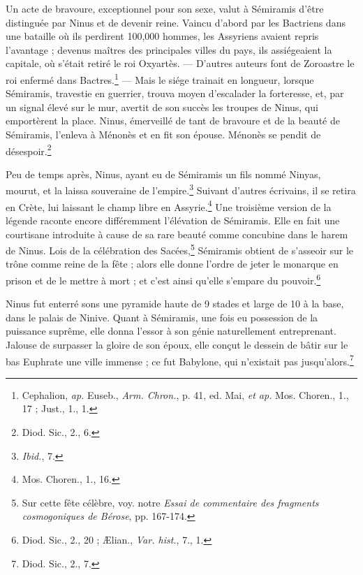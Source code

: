 \documentclass[a4paper, 11pt, oneside]{article}
\begin{document}
Un acte de bravoure, exceptionnel pour son sexe, valut à Sémiramis d'être distinguée par Ninus et de devenir reine. Vaincu d'abord par les Bactriens dans une bataille où ils perdirent 100,000 hommes, les Assyriens avaient repris l'avantage ; devenus maîtres des principales villes du pays, ils assiégeaient la capitale, où s'était retiré le roi Oxyartès. --- D'autres auteurs font de Zoroastre le roi enfermé dans Bactres.\footnote{Cephalion, \emph{ap.} Euseb., \emph{Arm. Chron.}, p. 41, ed. Mai, \emph{et ap.} Mos. Choren., 1., 17 ; Just., 1., 1.} --- Mais le siége trainait en longueur, lorsque Sémiramis, travestie en guerrier, trouva moyen d'escalader la forteresse, et, par un signal élevé sur le mur, avertit de son succès les troupes de Ninus, qui emportèrent la place. Ninus, émerveillé de tant de bravoure et de la beauté de Sémiramis, l'enleva à Ménonès et en fit son épouse. Ménonès se pendit de désespoir.\footnote{Diod. Sic., 2., 6.}

Peu de temps après, Ninus, ayant eu de Sémiramis un fils nommé Ninyas, mourut, et la laissa souveraine de l'empire.\footnote{\emph{Ibid.}, 7.} Suivant d'autres écrivains, il se retira en Crète, lui laissant le champ libre en Assyrie.\footnote{Mos. Choren., 1., 16.} Une troisième version de la légende raconte encore différemment l'élévation de Sémiramis. Elle en fait une courtisane introduite à cause de sa rare beauté comme concubine dans le harem de Ninus. Lois de la célébration des Sacées,\footnote{Sur cette fête célèbre, voy. notre \emph{Essai de commentaire des fragments cosmogoniques de Bérose}, pp. 167-174.} Sémiramis obtient de s'asseoir sur le trône comme reine de la fête ; alors elle donne l'ordre de jeter le monarque en prison et de le mettre à mort ; et c'est ainsi qu'elle s'empare du pouvoir.\footnote{Diod. Sic., 2., 20 ; Ælian., \emph{Var. hist.}, 7., 1.}

Ninus fut enterré sons une pyramide haute de 9 stades et large de 10 à la base, dans le palais de Ninive. Quant à Sémiramis, une fois eu possession de la puissance suprême, elle donna l'essor à son génie naturellement entreprenant. Jalouse de surpasser la gloire de son époux, elle conçut le dessein de bâtir sur le bas Euphrate une ville immense ; ce fut Babylone, qui n'existait pas jusqu'alors.\footnote{Diod. Sic., 2., 7.}
\end{document}
